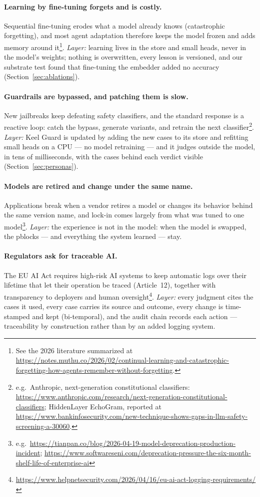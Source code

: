 \documentclass[11pt]{article}
\begin{document}
\paragraph{Learning by fine-tuning forgets and is costly.} Sequential fine-tuning erodes what a model already knows (catastrophic forgetting), and most agent adaptation therefore keeps the model frozen and adds memory around it\footnote{See the 2026 literature summarized at \url{https://notes.muthu.co/2026/02/continual-learning-and-catastrophic-forgetting-how-agents-remember-without-forgetting}.}. \emph{Layer:} learning lives in the store and small heads, never in the model's weights; nothing is overwritten, every lesson is versioned, and our substrate test found that fine-tuning the embedder added no accuracy (Section~\ref{sec:ablations}).

\paragraph{Guardrails are bypassed, and patching them is slow.} New jailbreaks keep defeating safety classifiers, and the standard response is a reactive loop: catch the bypass, generate variants, and retrain the next classifier\footnote{e.g.\ Anthropic, next-generation constitutional classifiers: \url{https://www.anthropic.com/research/next-generation-constitutional-classifiers}; HiddenLayer EchoGram, reported at \url{https://www.bankinfosecurity.com/new-technique-shows-gaps-in-llm-safety-screening-a-30060}.}. \emph{Layer:} Keel Guard is updated by adding the new cases to its store and refitting small heads on a CPU --- no model retraining --- and it judges outside the model, in tens of milliseconds, with the cases behind each verdict visible (Section~\ref{sec:personas}).

\paragraph{Models are retired and change under the same name.} Applications break when a vendor retires a model or changes its behavior behind the same version name, and lock-in comes largely from what was tuned to one model\footnote{e.g.\ \url{https://tianpan.co/blog/2026-04-19-model-deprecation-production-incident}; \url{https://www.softwareseni.com/deprecation-pressure-the-six-month-shelf-life-of-enterprise-ai}}. \emph{Layer:} the experience is not in the model: when the model is swapped, the pblocks --- and everything the system learned --- stay.

\paragraph{Regulators ask for traceable AI.} The EU AI Act requires high-risk AI systems to keep automatic logs over their lifetime that let their operation be traced (Article~12), together with transparency to deployers and human oversight\footnote{\url{https://www.helpnetsecurity.com/2026/04/16/eu-ai-act-logging-requirements/}}. \emph{Layer:} every judgment cites the cases it used, every case carries its source and outcome, every change is time-stamped and kept (bi-temporal), and the audit chain records each action --- traceability by construction rather than by an added logging system.
\end{document}
